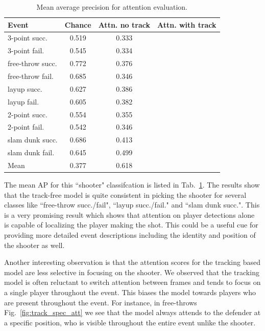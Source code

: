 \begin{table}[ht!]
\begin{center}
\small
 \begin{tabular}{|l|c|c|c|}
  \hline
Event            & Chance & Attn. no track & Attn. with track \\ \hline \hline
3-point succ.    & 0.519 & 0.333 & \\ 
3-point fail.    & 0.545 & 0.334 & \\ 
free-throw succ. & 0.772 & 0.376 & \\ 
free-throw fail. & 0.685 & 0.346 & \\  
layup succ.      & 0.627 & 0.386 & \\ 
layup fail.      & 0.605 & 0.382 & \\ 
2-point succ.    & 0.554 & 0.355 & \\ 
2-point fail.    & 0.542 & 0.346 & \\ 
slam dunk succ.  & 0.686 & 0.413 & \\ 
slam dunk fail.  & 0.645 & 0.499 & \\ \hline \hline  
Mean             & 0.377 & 0.618 & \\ \hline
  \end{tabular}
\end{center}
  \caption{Mean average precision for attention evaluation.}
  \label{tab:attention_res}
\end{table}

The mean AP for this ``shooter"  classifcation is listed
in Tab.~\ref{tab:attention_res}.
The results show that the track-free model is quite consistent in picking
the shooter for several classes like ``free-throw succ./fail",
``layup succ./fail." and ``slam dunk succ.". This is a very
promising result which shows that attention on player detections
alone is capable of localizing the player making the shot. This could be
a useful cue for providing more detailed event descriptions
including the identity and position of the shooter as well.

Another interesting observation
is that the
attention scores for the tracking based model are less selective in focusing on
the shooter.  We observed that the tracking model is often reluctant to switch
attention between frames and tends to focus on a single player throughout the
event. This biases the model towards players who are present throughout the
event. For instance, in free-throws Fig.~\ref{fig:track_spec_att} we see that
the model always attends to the defender at a specific position, who is visible
throughout the entire event unlike the shooter.

